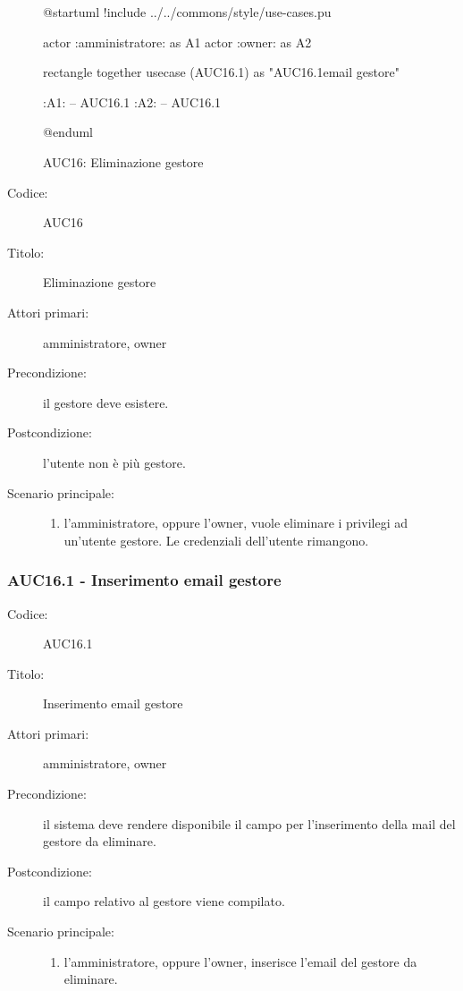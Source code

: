 \documentclass[../../../analisi-dei-requisiti.tex]{subfiles}
\begin{document}
\begin{figure}[h!]
  \centering
  \begin{plantuml}
  @startuml
  !include ../../commons/style/use-cases.pu

  actor :amministratore: as A1
  actor :owner: as A2


  rectangle {
    together {
      usecase (AUC16.1) as "AUC16.1\nInserimento email gestore"
    }
  }

  :A1: -- AUC16.1
  :A2: -- AUC16.1

  @enduml
  \end{plantuml}
  \caption{AUC16: Eliminazione gestore}
  \label{fig:auc16}
\end{figure}

\begin{description}
  \item[Codice:] AUC16
  \item[Titolo:] Eliminazione gestore
  \item[Attori primari:] amministratore, owner
  \item[Precondizione:] il gestore deve esistere.
  \item[Postcondizione:] l'utente non è più gestore.
  \item[Scenario principale:]
  \begin{enumerate}
    \item l'amministratore, oppure l'owner, vuole eliminare i privilegi ad un'utente gestore. Le credenziali dell'utente rimangono.
  \end{enumerate}
\end{description}

\subsubsection{AUC16.1 - Inserimento email gestore}%
\label{subs:AUC16.1}
\begin{description}
  \item[Codice:] AUC16.1
  \item[Titolo:] Inserimento email gestore
  \item[Attori primari:] amministratore, owner
  \item[Precondizione:] il sistema deve rendere disponibile il campo per l'inserimento della mail del gestore da eliminare.
  \item[Postcondizione:] il campo relativo al gestore viene compilato.
  \item[Scenario principale:]
  \begin{enumerate}
    \item l'amministratore, oppure l'owner, inserisce l'email del gestore da eliminare.
  \end{enumerate}
\end{description}
\end{document}
